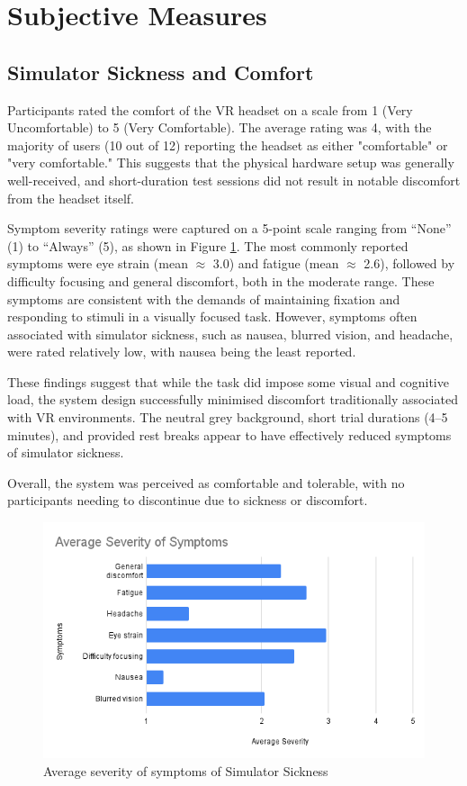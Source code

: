 \documentclass{l4proj}
\begin{document}
\section{Subjective Measures}

\subsection{Simulator Sickness and Comfort} 

Participants rated the comfort of the VR headset on a scale from 1 (Very Uncomfortable) to 5 (Very Comfortable). The average rating was 4, with the majority of users (10 out of 12) reporting the headset as either "comfortable" or "very comfortable." This suggests that the physical hardware setup was generally well-received, and short-duration test sessions did not result in notable discomfort from the headset itself.

Symptom severity ratings were captured on a 5-point scale ranging from “None” (1) to “Always” (5), as shown in Figure \ref{fig:ssqbar}. The most commonly reported symptoms were eye strain (mean $\approx$ 3.0) and fatigue (mean $\approx$ 2.6), followed by difficulty focusing and general discomfort, both in the moderate range. These symptoms are consistent with the demands of maintaining fixation and responding to stimuli in a visually focused task. However, symptoms often associated with simulator sickness, such as nausea, blurred vision, and headache, were rated relatively low, with nausea being the least reported.

These findings suggest that while the task did impose some visual and cognitive load, the system design successfully minimised discomfort traditionally associated with VR environments. The neutral grey background, short trial durations (4–5 minutes), and provided rest breaks appear to have effectively reduced symptoms of simulator sickness.

Overall, the system was perceived as comfortable and tolerable, with no participants needing to discontinue due to sickness or discomfort.

\begin{figure}[!h]
    \centering
    \includegraphics[width=0.75\linewidth]{images/SSQ barchart.png}
    \caption{Average severity of symptoms of Simulator Sickness}
    \label{fig:ssqbar}
\end{figure}
\end{document}
